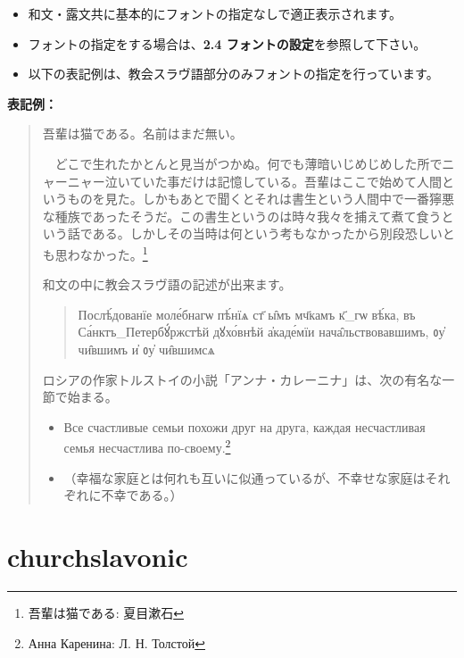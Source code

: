 \documentclass[a4paper,12pt]{ltjsarticle}
\begin{document}
\begin{itemize}
  \item 和文・露文共に基本的にフォントの指定なしで適正表示されます。
  \item フォントの指定をする場合は、\textbf{2.4 フォントの設定}を参照して下さい。
  \item 以下の表記例は、教会スラヴ語部分のみフォントの指定を行っています。
  \end{itemize}
\vspace{-2mm}
\hspace{12mm}\textbf{表記例：}
\vspace{-2mm}
\begin{quote}
吾輩は猫である。名前はまだ無い。\par
　どこで生れたかとんと見当がつかぬ。何でも薄暗いじめじめした所でニャーニャー泣いていた事だけは記憶している。吾輩はここで始めて人間というものを見た。しかもあとで聞くとそれは書生という人間中で一番獰悪な種族であったそうだ。この書生というのは時々我々を捕えて煮て食うという話である。しかしその当時は何という考もなかったから別段恐しいとも思わなかった。\footnote{吾輩は猫である: 夏目漱石}\par
和文の中に教会スラヴ語の記述が出来ます。
\begin{quote}
{\Monomakh Послѣ́дованїе моле́бнагѡ пѣ́нїѧ ст҃ ы̑мъ мч҃камъ к҃_гѡ вѣ́ка, въ Са́нктъ_Петербꙋ́ржстѣй дꙋхо́внѣй а҆каде́мїи нача̑льствовавшимъ, ᲂу҆ чи̑вшимъ и҆ ᲂу҆ чи̑вшимсѧ}\par
\end{quote}
ロシアの作家トルストイの小説「アンナ・カレーニナ」は、次の有名な一節で始まる。
\begin{itemize}
\item[] Все счастливые семьи похожи друг на друга, каждая несчастливая семья несчастлива по-своему.\footnote{Анна Каренина: Л. Н. Толстой}
\item[]（幸福な家庭とは何れも互いに似通っているが、不幸せな家庭はそれぞれに不幸である。）
\end{itemize}
\end{quote}
\vspace{-10mm}

\section{\textbf{churchslavonic}}
\end{document}
